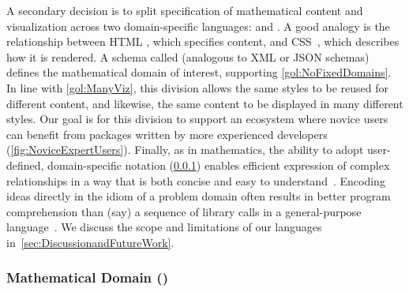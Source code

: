 A secondary decision is to split specification of mathematical content and visualization across two domain-specific languages: \Substance{} and \Style{}.  A good analogy is the relationship between HTML \cite{BernersLee:1995:HML}, which specifies content, and CSS~\cite{Lie:2005:CSS}, which describes how it is rendered.  A schema called \Domain{} (analogous to XML or JSON schemas) defines the mathematical domain of interest, supporting \ref{gol:NoFixedDomains}.  In line with \ref{gol:ManyViz}, this division allows the same styles to be reused for different content, and likewise, the same content to be displayed in many different styles.  Our goal is for this division to support an ecosystem where novice users can benefit from packages written by more experienced developers (\cref{fig:NoviceExpertUsers}).  Finally, as in mathematics, the ability to adopt user-defined, domain-specific notation (\cref{sec:MathematicalDomain}) enables efficient expression of complex relationships in a way that is both concise and easy to understand~\cite{Kosar:2012:PCD}.  Encoding ideas directly in the idiom of a problem domain often results in better program comprehension than (say) a sequence of library calls in a general-purpose language~\cite{van_deursen_domain-specific_2000}.  We discuss the scope and limitations of our languages in~\cref{sec:DiscussionandFutureWork}.





\subsubsection{Mathematical Domain (\Domain{})}
\label{sec:MathematicalDomain}

